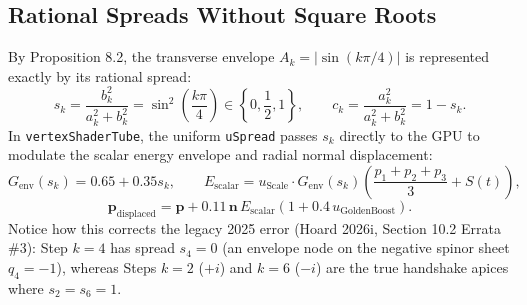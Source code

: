 \documentclass[11pt, a4paper]{article}
\begin{document}
\subsection{Rational Spreads Without Square Roots}
By Proposition 8.2, the transverse envelope $A_k = |\sin(k\pi/4)|$ is represented exactly by its rational spread:
\begin{equation}
s_k = \frac{b_k^2}{a_k^2 + b_k^2} = \sin^2\!\left(\frac{k\pi}{4}\right) \in \left\{0, \frac{1}{2}, 1\right\}, \qquad c_k = \frac{a_k^2}{a_k^2 + b_k^2} = 1 - s_k.
\end{equation}
In \texttt{vertexShaderTube}, the uniform \texttt{uSpread} passes $s_k$ directly to the GPU to modulate the scalar energy envelope and radial normal displacement:
\begin{equation}
G_{\text{env}}(s_k) = 0.65 + 0.35 s_k, \qquad E_{\text{scalar}} = u_{\text{Scale}} \cdot G_{\text{env}}(s_k)\left(\frac{p_1 + p_2 + p_3}{3} + S(t)\right),
\end{equation}
\begin{equation}
\mathbf{p}_{\text{displaced}} = \mathbf{p} + 0.11\,\mathbf{n}\,E_{\text{scalar}}\left(1 + 0.4\,u_{\text{GoldenBoost}}\right).
\end{equation}
Notice how this corrects the legacy 2025 error (Hoard 2026i, Section 10.2 Errata \#3): Step $k=4$ has spread $s_4 = 0$ (an envelope node on the negative spinor sheet $q_4 = -1$), whereas Steps $k=2$ ($+i$) and $k=6$ ($-i$) are the true handshake apices where $s_2 = s_6 = 1$.
\end{document}
